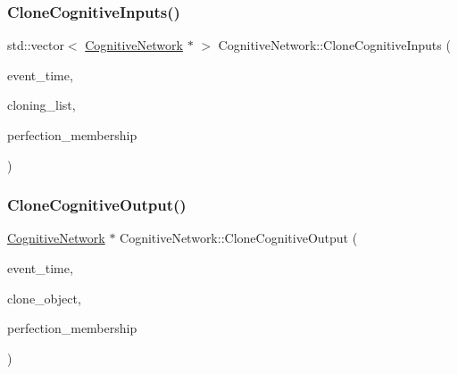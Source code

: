 \subsubsection{\texorpdfstring{Clone\+Cognitive\+Inputs()}{CloneCognitiveInputs()}}
{\footnotesize\ttfamily std\+::vector$<$ \mbox{\hyperlink{classCognitiveNetwork}{Cognitive\+Network}} $\ast$ $>$ Cognitive\+Network\+::\+Clone\+Cognitive\+Inputs (\begin{DoxyParamCaption}\item[{std\+::chrono\+::time\+\_\+point$<$ \mbox{\hyperlink{universe_8h_a0ef8d951d1ca5ab3cfaf7ab4c7a6fd80}{Clock}} $>$}]{event\+\_\+time,  }\item[{std\+::vector$<$ \mbox{\hyperlink{classCognitiveNetwork}{Cognitive\+Network}} $\ast$$>$}]{cloning\+\_\+list,  }\item[{double}]{perfection\+\_\+membership }\end{DoxyParamCaption})}

\mbox{\label{classCognitiveNetwork_ab24f74115c11275f365245a4bb826c91}} 
\subsubsection{\texorpdfstring{Clone\+Cognitive\+Output()}{CloneCognitiveOutput()}}
{\footnotesize\ttfamily \mbox{\hyperlink{classCognitiveNetwork}{Cognitive\+Network}} $\ast$ Cognitive\+Network\+::\+Clone\+Cognitive\+Output (\begin{DoxyParamCaption}\item[{std\+::chrono\+::time\+\_\+point$<$ \mbox{\hyperlink{universe_8h_a0ef8d951d1ca5ab3cfaf7ab4c7a6fd80}{Clock}} $>$}]{event\+\_\+time,  }\item[{\mbox{\hyperlink{classCognitiveNetwork}{Cognitive\+Network}} $\ast$}]{clone\+\_\+object,  }\item[{double}]{perfection\+\_\+membership }\end{DoxyParamCaption})}

\mbox{\label{classCognitiveNetwork_a5734aa5378e9b701dca5e98017c1ea35}} 
